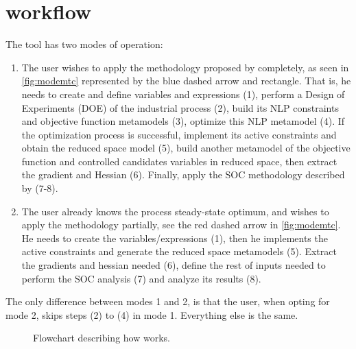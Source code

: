 \documentclass[../msc-thesis.tex]{subfiles}
\begin{document}
\section{\mtc workflow} \label{subsection:mtcworkflow}


The tool has two modes of operation:
\begin{enumerate}
    \item The user wishes to apply the methodology proposed by 
    \textcite{Alves2018} completely, as seen in \autoref{fig:modemtc} 
    represented by the blue dashed arrow and rectangle. That is, he needs 
    to create and define variables and expressions (1), perform a Design of 
    Experiments (DOE) of the industrial process (2), build its NLP 
    constraints and objective function metamodels (3), optimize this NLP 
    metamodel (4). If the optimization process is successful, implement 
    its active constraints and obtain the reduced space model (5), build 
    another metamodel of the objective function and controlled candidates 
    variables in reduced space, then extract the gradient and Hessian (6). 
    Finally, apply the SOC methodology described by 
    \textcite{Alstad2009} (7-8).
    
    \item The user already knows the process steady-state optimum, and wishes 
    to apply the methodology partially, see the red dashed arrow in 
    \autoref{fig:modemtc}. He needs to create the variables/expressions (1), 
    then he implements the active constraints and generate the reduced 
    space metamodels (5). Extract the gradients and hessian needed (6), 
    define the rest of inputs needed to perform the SOC analysis (7) and 
    analyze its results (8).
\end{enumerate}

The only difference between modes 1 and 2, is that the user, when opting for 
mode 2, skips steps (2) to (4) in mode 1. Everything else is the same.

\begin{figure}[h]
    \caption{Flowchart describing how \mtc works.}
    \centering
    \label{fig:modemtc}
\end{figure}
\end{document}

